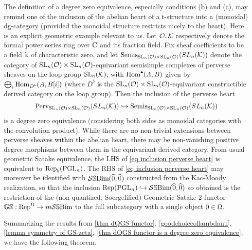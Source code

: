 \begin{remark}
    The definition of a degree zero equivalence, especially conditions (b) and (c), may remind one of the inclusion of the abelian heart of a t-structure into a (monoidal) dg-category (provided the monoidal structure restricts nicely to the heart). Here is an explicit geometric example relevant to us.
    Let $\mathcal{O}, \mathcal{K}$ respectively denote the formal power series ring over $\mathbb{C}$ and its fraction field. Fix sheaf coefficients to be a field $\Bbbk$ of characteristic zero, and let $\operatorname{Semis}_{\operatorname{SL}_n({\mathcal{O}})\times \operatorname{SL}_n({\mathcal{O})}}(SL_n({\mathcal{K}}))$ denote the category of ${\operatorname{SL}_n({\mathcal{O}})\times \operatorname{SL}_n({\mathcal{O})}}$-equivariant semisimple complexes of perverse sheaves on the loop group $\operatorname{SL}_n(\mathcal{K})$, with $\operatorname{Hom}^{\bullet}(A,B)$ given by  $\bigoplus_i \operatorname{Hom}_{D^b}(A,B[i])$ (where $D^b$ is the ${\operatorname{SL}_n({\mathcal{O}})\times \operatorname{SL}_n({\mathcal{O})}}$-equivariant constructible derived category on the loop group).
    Then the inclusion of the perverse heart
    \begin{equation} \label{eq inclusion perverse heart} \operatorname{Perv}_{\operatorname{SL}_n({\mathcal{O}})\times \operatorname{SL}_n({\mathcal{O})}}(SL_n({\mathcal{K}})) \hookrightarrow \operatorname{Semis}_{\operatorname{SL}_n({\mathcal{O}})\times \operatorname{SL}_n({\mathcal{O})}}(SL_n({\mathcal{K}}))\end{equation}
    is a degree zero equivalence (considering both sides as monoidal categories with the convolution product).
    While there are no non-trivial extensions between perverse sheaves within the abelian heart, there may be non-vanishing positive degree morphisms between them in the equivariant derived category.
    From usual geometric Satake equivalence, the LHS of \cref{eq inclusion perverse heart} is equivalent to $\operatorname{Rep}_{\Bbbk}(\operatorname{PGL}_n)$.
    The RHS of \cref{eq inclusion perverse heart} may moreover be identified with $ \mathcal{S}\mathbb{S}\text{Bim}(\widehat{0},\widehat{0})$ constructed from the Kac-Moody realization, so that the inclusion $\operatorname{Rep}(\operatorname{PGL}_n)\hookrightarrow \mathcal{S}\mathbb{S}\text{Bim}(\widehat{0},\widehat{0})$ so obtained is the restriction of the (non-quantized, Soergelified) Geometric Satake 2-functor $\mathbb{GS}: \operatorname{Rep}^{\Omega} \rightarrow m\mathcal{S}\mathbb{S}\text{Bim}$ to the full subcategory with a single object $0 \in \Omega$. 
\end{remark}


Summarizing the results from \cref{thm dQGS functor}, \cref{goodchoiceoflambdanu}, \cref{lemma symmetry of GS-zeta}, \cref{thm dQGS functor is a degree zero equivalence}, we have the following theorem.

